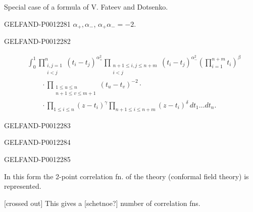 Special case of a formula of V. Fateev and Dotsenko.


\begin{GelfandAdjacentEvidence}{GELFAND-P001228}{1}
\(\alpha_+,\alpha_-\), \(\alpha_+\alpha_-=-2\).
\end{GelfandAdjacentEvidence}
\begin{GelfandAdjacentEvidence}{GELFAND-P001228}{2}

\begin{equation*}
\begin{aligned}
&\int_0^1
\prod_{\substack{i,j=1\\i<j}}^{n}(t_i-t_j)^{\alpha_+^2}
\prod_{\substack{n+1\le i,j\le n+m\\i<j}}(t_i-t_j)^{\alpha_-^2}
\left(\prod_{i=1}^{n+m}t_i\right)^\beta\\
&\qquad{}\cdot\prod_{\substack{1\le u\le n\\n+1\le v\le m+1}}(t_u-t_v)^{-2}\cdot\\
&\qquad{}\cdot\prod_{1\le i\le n}(z-t_i)^\gamma
\prod_{n+1\le i\le n+m}(z-t_i)^\delta\,dt_1\ldots dt_n.
\end{aligned}\tag{18}
\end{equation*}
\end{GelfandAdjacentEvidence}
\begin{GelfandAdjacentEvidence}{GELFAND-P001228}{3}

\end{GelfandAdjacentEvidence}
\begin{GelfandAdjacentEvidence}{GELFAND-P001228}{4}

\end{GelfandAdjacentEvidence}
\begin{GelfandAdjacentEvidence}{GELFAND-P001228}{5}


In this form the 2-point correlation fn. of the theory (conformal field theory) is represented.

[crossed out] This gives a [schetnoe?] number of correlation fns.
\end{GelfandAdjacentEvidence}
